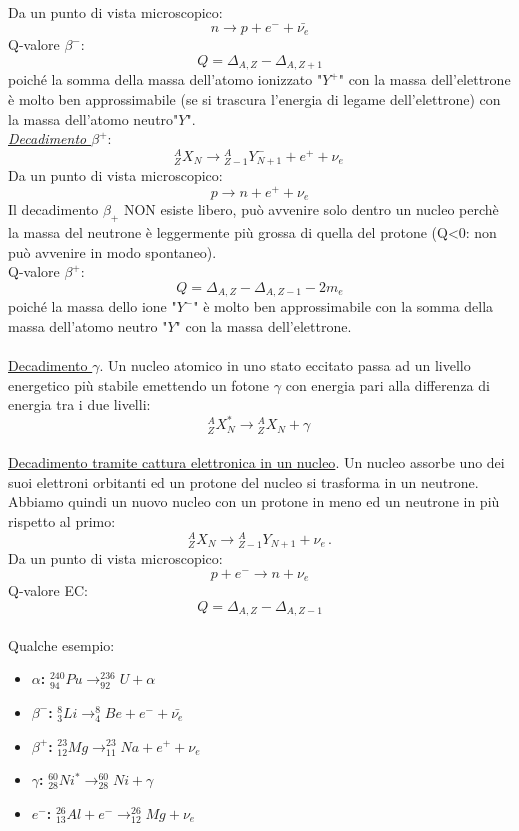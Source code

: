 \documentclass[twoside]{article}
\begin{document}
Da un punto di vista microscopico:
\[
n \rightarrow p+e^-+\bar{\nu_e}
\]
Q-valore $\beta^-$:
\begin{equation}
    Q=\Delta_{A,Z}-\Delta_{A,Z+1}
\end{equation}
poiché la somma della massa dell'atomo ionizzato "$Y^+$" con la massa dell'elettrone è molto ben approssimabile (se si trascura l'energia di legame dell'elettrone) con la massa dell'atomo neutro"$Y$".\\
\textit{\underline{Decadimento $\beta ^+$}}:
\begin{equation}
{}_{Z}^{A}X_N \longrightarrow {}_{Z-1}^{A}Y_{N+1}^-+ e^+ + \nu_e \, 
\end{equation}
Da un punto di vista microscopico:
\[
p \rightarrow n+e^++\nu_e
\]
\warning Il decadimento $\beta_+$ NON esiste libero, può avvenire solo dentro un nucleo perchè la massa del neutrone è leggermente più grossa di quella del protone (Q<0: non può avvenire in modo spontaneo).\\
Q-valore $\beta^+$:
\begin{equation}
    Q=\Delta_{A,Z}-\Delta_{A, Z-1}-2m_e
\end{equation}
poiché la massa dello ione "$Y^-$" è molto ben approssimabile con la somma della massa dell'atomo neutro "$Y$" con la massa dell'elettrone.\\
\\
\underline{Decadimento $\gamma$}. Un nucleo atomico in uno stato eccitato passa ad un livello energetico più stabile emettendo un fotone $\gamma$ con energia pari alla differenza di energia tra i due livelli:
\begin{equation}
{}_{Z}^{A}X_N^*\longrightarrow {}_{Z}^{A}X_N + \gamma \, 
\end{equation} 
\\
\underline{Decadimento tramite cattura elettronica in un nucleo}. Un nucleo assorbe uno dei suoi elettroni orbitanti ed un protone del nucleo si trasforma in un neutrone. Abbiamo quindi un nuovo nucleo con un protone in meno ed un neutrone in più rispetto al primo:
\begin{equation}
{}_{Z}^{A}X_N  \longrightarrow {}_{Z-1}^{A}Y_{N+1} + \nu_e \, .
\end{equation}
Da un punto di vista microscopico:
\[
p+e^- \rightarrow n+\nu_e
\]
Q-valore EC:
\begin{equation}
    Q=\Delta_{A,Z}-\Delta _{A,Z-1}
\end{equation}
\\
Qualche esempio:
\begin{itemize}
\item \textbf{$\alpha$:} $^{240}_{94} Pu \longrightarrow ^{236}_{92} U + \alpha$ 
\item \textbf{$\beta^-$:} $^8_3 Li \longrightarrow ^8_4 Be + e^- + \bar{\nu_e}$
\item \textbf{$\beta^+$:} $^{23}_{12} Mg \longrightarrow ^{23}_{11}Na + e^+ + \nu_e$
\item \textbf{$\gamma$:} $^{60}_{28} Ni^* \longrightarrow ^{60}_{28} Ni + \gamma$
\item \textbf{$e^-$:} $^{26}_{13}Al + e^- \longrightarrow ^{26}_{12} Mg + \nu_e$
\end{itemize}
\end{document}
